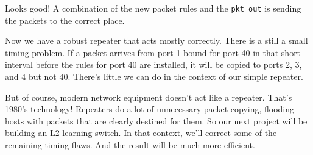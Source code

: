 Looks good!  A combination of the new packet rules and the \texttt{pkt\_out} 
is sending the packets to the correct place.  

Now we have a robust repeater that acts mostly correctly.  There is a still a small timing problem.  If a packet
arrives from port 1 bound for port 40 in that short interval before the rules for port 40 are installed, it
will be copied to ports 2, 3, and 4 but not 40.  There's little we can do in the context of our simple repeater.

But of course, modern network equipment doesn't act like a repeater.  That's 1980's technology!  Repeaters
do a lot of unnecessary packet copying, flooding hosts with packets that are clearly destined for them.  
So our next project will be building an L2 learning switch.  In that context, we'll correct some of the 
remaining timing flaws.  And the result will be much more efficient. 